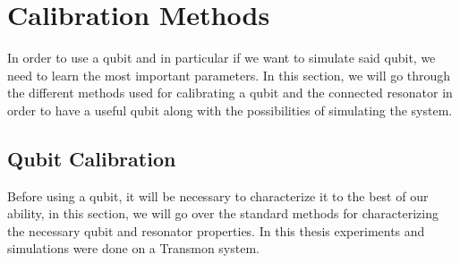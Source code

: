 \chapter{Calibration Methods}\label{chap:calibration}
In order to use a qubit and in particular if we want to simulate said qubit, we need to learn the most important parameters. In this section, we will go through the different methods used for calibrating a qubit and the connected resonator in order to have a useful qubit along with the possibilities of simulating the system.


\section{Qubit Calibration}
Before using a qubit, it will be necessary to characterize it to the best of our ability, in this section, we will go over the standard methods for characterizing the necessary qubit and resonator properties. In this thesis experiments and simulations were done on a Transmon system.

